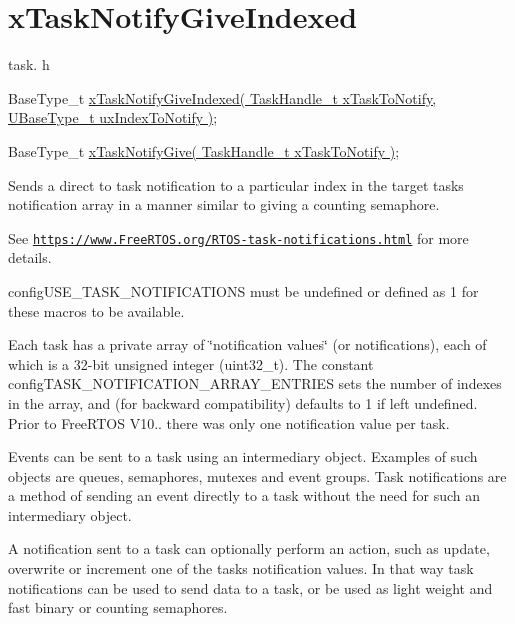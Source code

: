 \hypertarget{group__x_task_notify_give_indexed}{}\section{x\+Task\+Notify\+Give\+Indexed}
\label{group__x_task_notify_give_indexed}
task. h 
\begin{DoxyPre}BaseType\_t \hyperlink{externals_2freertos_2include_2task_8h_a53ec0c8b6b8281a3055747813570193c}{xTaskNotifyGiveIndexed( TaskHandle\_t xTaskToNotify, UBaseType\_t uxIndexToNotify )};\end{DoxyPre}
 
\begin{DoxyPre}BaseType\_t \hyperlink{externals_2freertos_2include_2task_8h_ac60cbd05577a3e4f3c3587dd9b213930}{xTaskNotifyGive( TaskHandle\_t xTaskToNotify )};\end{DoxyPre}


Sends a direct to task notification to a particular index in the target task\textquotesingle{}s notification array in a manner similar to giving a counting semaphore.

See \href{https://www.FreeRTOS.org/RTOS-task-notifications.html}{\tt https\+://www.\+Free\+R\+T\+O\+S.\+org/\+R\+T\+O\+S-\/task-\/notifications.\+html} for more details.

config\+U\+S\+E\+\_\+\+T\+A\+S\+K\+\_\+\+N\+O\+T\+I\+F\+I\+C\+A\+T\+I\+O\+NS must be undefined or defined as 1 for these macros to be available.

Each task has a private array of \char`\"{}notification values\char`\"{} (or \textquotesingle{}notifications\textquotesingle{}), each of which is a 32-\/bit unsigned integer (uint32\+\_\+t). The constant config\+T\+A\+S\+K\+\_\+\+N\+O\+T\+I\+F\+I\+C\+A\+T\+I\+O\+N\+\_\+\+A\+R\+R\+A\+Y\+\_\+\+E\+N\+T\+R\+I\+ES sets the number of indexes in the array, and (for backward compatibility) defaults to 1 if left undefined. Prior to Free\+R\+T\+OS V10.. there was only one notification value per task.

Events can be sent to a task using an intermediary object. Examples of such objects are queues, semaphores, mutexes and event groups. Task notifications are a method of sending an event directly to a task without the need for such an intermediary object.

A notification sent to a task can optionally perform an action, such as update, overwrite or increment one of the task\textquotesingle{}s notification values. In that way task notifications can be used to send data to a task, or be used as light weight and fast binary or counting semaphores.


